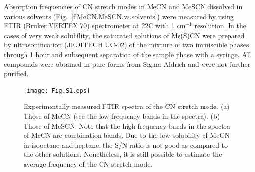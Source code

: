 \documentclass[a4paper,titlepage,twoside,fleqn,12pt]{book}
\begin{document}
\begin{appendices}
Absorption frequencies of CN stretch modes in MeCN and MeSCN dissolved in various
solvents (Fig.~\ref{f.MeCN.MeSCN.vs.solvents}) were measured by using FTIR (Bruker VERTEX 70) 
spectrometer at 22{\degree}C with 1 cm$^{-1}$ 
resolution. In the cases of very weak solubility, the saturated solutions of Me(S)CN were 
prepared by ultrasonification (JEOITECH UC-02) of the mixture of two immiscible phases 
through 1 hour and subsequent separation of the sample phase with a syringe. All compounds 
were obtained in pure forms from Sigma Aldrich and were not further purified.
%
\begin{figure}[ht]
\centering
\setlength\fboxsep{0.4pt}
\setlength\fboxrule{0.5pt}
\texttt{[image: Fig.S1.eps]}
\caption{Experimentally measured FTIR spectra of the CN stretch mode. (a) Those of
MeCN (see the low frequency bands in the spectra). (b) Those of MeSCN. Note that the high 
frequency bands in the spectra of MeCN are combination bands. Due to the low solubility of 
MeCN in isooctane and heptane, the S/N ratio is not good as compared to the other solutions. 
Nonetheless, it is still possible to estimate the average frequency of the CN stretch mode.
\label{f.MeCN.MeSCN.vs.solvents.spectra}}
\end{figure}
%

\end{appendices}


%
%
\end{document}
